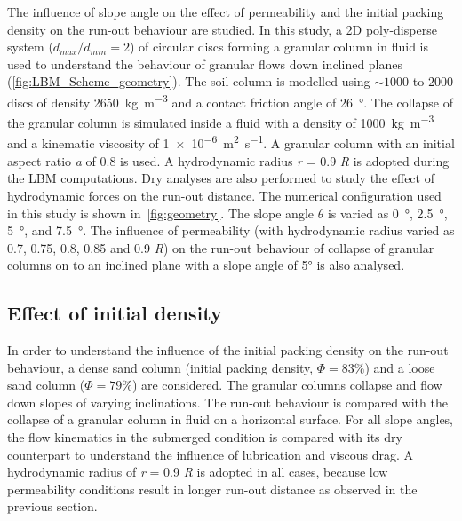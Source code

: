 The influence of slope angle on the effect of permeability and the initial 
packing density on the run-out behaviour are studied. In this study, a 2D 
poly-disperse system ($d_{max}/d_{min} = 2$) of circular discs forming a 
granular column in fluid is used to understand the behaviour of granular flows 
down inclined planes (\cref{fig:LBM_Scheme_geometry}). The soil column is 
modelled using $\sim 1000$ to $2000$ discs of density 
\SI{2650}{\kg\per\cubic\meter} and a contact friction angle of 
\SI{26}{\degree}. The collapse of the granular column is simulated inside a 
fluid with a density of \SI{1000}{\kg\per\cubic\meter} and a kinematic 
viscosity of \SI{1e-6}{\square\meter\per\second}. A granular column with 
an initial aspect ratio \textit{a} of 0.8 is used. A hydrodynamic radius 
\textit{r} = 0.9 \textit{R} is adopted during the LBM computations. Dry 
analyses are also performed to study the effect of hydrodynamic forces on the 
run-out distance. The numerical configuration used in this study is shown 
in~\cref{fig:geometry}. The slope angle $\theta$ is varied as \SI{0}{\degree}, 
\SI{2.5}{\degree}, \SI{5}{\degree}, and \SI{7.5}{\degree}. The influence of 
permeability (with hydrodynamic radius varied as 0.7, 0.75, 0.8, 0.85 and 0.9 
\textit{R}) on the run-out behaviour of collapse of granular columns on to an 
inclined plane with a slope angle of 5\si{\degree} is also analysed. 


\subsection{Effect of initial density}

In order to understand the influence of the initial packing density on the 
run-out behaviour, a dense sand column (initial packing density, $\Phi=83\%$) 
and a loose sand column ($\Phi=79\%$) are considered. The granular columns 
collapse and flow down slopes of varying inclinations. The run-out behaviour is 
compared with the collapse of a granular column in fluid on a horizontal 
surface. For all slope angles, the flow kinematics in the submerged condition 
is compared with its dry counterpart to understand the influence of lubrication 
and viscous drag. A hydrodynamic radius of \textit{r} = 0.9 \textit{R} is 
adopted in all cases, because low permeability conditions result in longer 
run-out distance as observed in the previous section.


